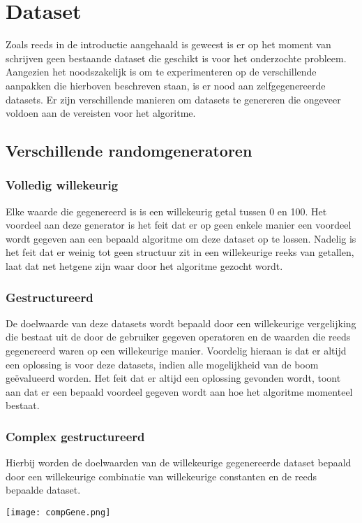 \documentclass[Main.tex]{subfiles}
\begin{document}
\section{Dataset}

Zoals reeds in de introductie aangehaald is geweest is er op het moment van schrijven geen bestaande dataset die geschikt is voor het onderzochte probleem. Aangezien het noodszakelijk is om te experimenteren op de verschillende aanpakken die hierboven beschreven staan, is er nood aan zelfgegenereerde datasets. Er zijn verschillende manieren om datasets te genereren die ongeveer voldoen aan de vereisten voor het algoritme.
  
\subsection{Verschillende randomgeneratoren}
\subsubsection*{Volledig willekeurig}
Elke waarde die gegenereerd is is een willekeurig getal tussen 0 en 100. Het voordeel aan deze generator is het feit dat er op geen enkele manier een voordeel wordt gegeven aan een bepaald algoritme om deze dataset op te lossen. Nadelig is het feit dat er weinig tot geen structuur zit in een willekeurige reeks van getallen, laat dat net hetgene zijn waar door het algoritme gezocht wordt.

\subsubsection*{Gestructureerd}
De doelwaarde van deze datasets wordt bepaald door een willekeurige vergelijking die bestaat uit de door de gebruiker gegeven operatoren en de waarden die reeds gegenereerd waren op een willekeurige manier. Voordelig hieraan is dat er altijd een oplossing is voor deze datasets, indien alle mogelijkheid van de boom ge\"evalueerd worden. Het feit dat er altijd een oplossing gevonden wordt, toont aan dat er een bepaald voordeel gegeven wordt aan hoe het algoritme momenteel bestaat.

\subsubsection*{Complex gestructureerd}
Hierbij worden de doelwaarden van de willekeurige gegenereerde dataset bepaald door een willekeurige combinatie van willekeurige constanten en de reeds bepaalde dataset. %
\begin{center}
\texttt{[image: compGene.png]}
\end{center}
\end{document}
